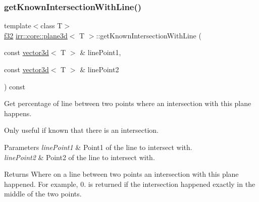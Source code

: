 \subsubsection{\texorpdfstring{get\+Known\+Intersection\+With\+Line()}{getKnownIntersectionWithLine()}\hspace{0.1cm}{\footnotesize\ttfamily [1/2]}}
{\footnotesize\ttfamily template$<$class T$>$ \\
\hyperlink{namespaceirr_a0277be98d67dc26ff93b1a6a1d086b07}{f32} \hyperlink{classirr_1_1core_1_1plane3d}{irr\+::core\+::plane3d}$<$ T $>$\+::get\+Known\+Intersection\+With\+Line (\begin{DoxyParamCaption}\item[{const \hyperlink{classirr_1_1core_1_1vector3d}{vector3d}$<$ T $>$ \&}]{line\+Point1,  }\item[{const \hyperlink{classirr_1_1core_1_1vector3d}{vector3d}$<$ T $>$ \&}]{line\+Point2 }\end{DoxyParamCaption}) const\hspace{0.3cm}{\ttfamily [inline]}}



Get percentage of line between two points where an intersection with this plane happens. 

Only useful if known that there is an intersection. 
\begin{DoxyParams}{Parameters}
{\em line\+Point1} & Point1 of the line to intersect with. \\
\hline
{\em line\+Point2} & Point2 of the line to intersect with. \\
\hline
\end{DoxyParams}
\begin{DoxyReturn}{Returns}
Where on a line between two points an intersection with this plane happened. For example, 0. is returned if the intersection happened exactly in the middle of the two points. 
\end{DoxyReturn}
\mbox{\label{classirr_1_1core_1_1plane3d_a5fcd4852c2634172862324340558c634}} 
